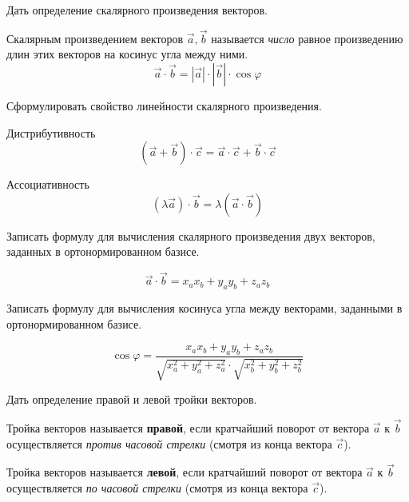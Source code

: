 \begin{question}
  Дать определение скалярного произведения векторов.
\end{question}
\begin{answer}
  Скалярным произведением векторов $\vec{a}, \vec{b}$ называется \textit{число}  равное произведению длин этих векторов на косинус угла между ними.\[
  \vec{a} \cdot \vec{b} = |\vec{a}| \cdot |\vec{b}| \cdot \cos \varphi
  \] 
\end{answer}

\begin{question}
  Сформулировать свойство линейности скалярного произведения.
\end{question}
\begin{answer}
  Дистрибутивность \[
      (\vec{a} + \vec{b}) \cdot \vec{c} = \vec{a} \cdot \vec{c} + \vec{b} \cdot \vec{c}
  \]

  Ассоциативность \[
    (\lambda \vec{a}) \cdot \vec{b} = \lambda (\vec{a} \cdot \vec{b}) 
  \]
\end{answer}

\begin{question}
  Записать формулу для вычисления скалярного произведения двух векторов, заданных в ортонормированном базисе.
\end{question}
\begin{answer}
  \[
    \vec{a} \cdot \vec{b} = x_a x_b + y_a y_b + z_a z_b  
  \] 
\end{answer}

\begin{question}
  Записать формулу для вычисления косинуса угла между векторами, заданными в ортонормированном базисе.
\end{question}
\begin{answer}
  \[
 \cos \varphi = \frac{x_a x_b + y_a y_b + z_a z_b}{\sqrt{x_a^2 + y_a^2 + z_a^2} \cdot \sqrt{x_b^2 + y_b^2 + z_b^2}}
  \] 
\end{answer}

\begin{question}
  Дать определение правой и левой тройки векторов.
\end{question}
\begin{answer}
  Тройка векторов называется \textbf{правой}, если кратчайший поворот от вектора $\vec{a}$ к $\vec{b}$ осуществляется \textit{против часовой стрелки} (смотря из конца вектора $\vec{c}$).

  Тройка векторов называется \textbf{левой}, если кратчайший поворот от вектора $\vec{a}$ к $\vec{b}$ осуществляется \textit{по часовой стрелки} (смотря из конца вектора $\vec{c}$).
\end{answer}


